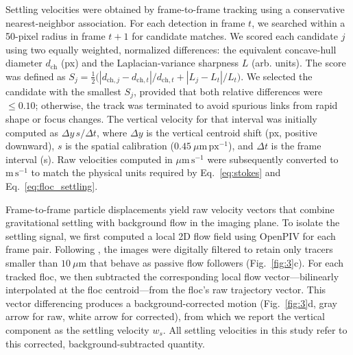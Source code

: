 \documentclass{agujournal2019}
\providecommand{\DIFadd}[1]{{\protect\color{blue} #1}} %
\providecommand{\DIFdel}[1]{{\protect\color{red}\sout{#1}}} %
\providecommand{\DIFaddbegin}{\protect\color{blue}} %
\providecommand{\DIFaddend}{\protect\color{black}} %
\providecommand{\DIFdelbegin}{\protect\color{red}} %
\providecommand{\DIFdelend}{\protect\color{black}} %
\newcommand{\DIFscaledelfig}{0.5}
\newlength{\DIFdelgraphicswidth} %
\newlength{\DIFdelgraphicsheight} %
\newcommand{\DIFaddincludegraphics}[2][]{{\color{blue}\fbox{\DIFOincludegraphics[#1]{#2}}}} %
\newcommand{\DIFdelincludegraphics}[2][]{%
\sbox{\DIFdelgraphicsbox}{\DIFOincludegraphics[#1]{#2}}%
\settoboxwidth{\DIFdelgraphicswidth}{\DIFdelgraphicsbox} %
\settoboxtotalheight{\DIFdelgraphicsheight}{\DIFdelgraphicsbox} %
\scalebox{\DIFscaledelfig}{%
\parbox[b]{\DIFdelgraphicswidth}{\usebox{\DIFdelgraphicsbox}\\[-\baselineskip] \rule{\DIFdelgraphicswidth}{0em}}\llap{\resizebox{\DIFdelgraphicswidth}{\DIFdelgraphicsheight}{%
\setlength{\unitlength}{\DIFdelgraphicswidth}%
\begin{picture}(1,1)%
\thicklines\linethickness{2pt} %
{\color[rgb]{1,0,0}\put(0,0){\framebox(1,1){}}}%
{\color[rgb]{1,0,0}\put(0,0){\line( 1,1){1}}}%
{\color[rgb]{1,0,0}\put(0,1){\line(1,-1){1}}}%
\end{picture}%
}\hspace*{3pt}}} %
} %
\DeclareRobustCommand{\DIFaddbegin}{\DIFOaddbegin \let\includegraphics\DIFaddincludegraphics} %
\DeclareRobustCommand{\DIFaddend}{\DIFOaddend \let\includegraphics\DIFOincludegraphics} %
\DeclareRobustCommand{\DIFdelbegin}{\DIFOdelbegin \let\includegraphics\DIFdelincludegraphics} %
\DeclareRobustCommand{\DIFdelend}{\DIFOaddend \let\includegraphics\DIFOincludegraphics} %
\begin{document}
Settling velocities were obtained by frame-to-frame tracking using a conservative nearest-neighbor association. For each detection in frame \(t\), we searched within a 50-pixel radius in frame \(t{+}1\) for candidate matches. We scored each candidate \(j\) using two equally weighted, normalized differences: the equivalent concave-hull diameter \(d_{\mathrm{ch}}\) (px) and the Laplacian-variance sharpness \(L\) (arb. units). The score was defined as \(S_j=\tfrac{1}{2}\big(|d_{\mathrm{ch},j}-d_{\mathrm{ch},t}|/d_{\mathrm{ch},t}+|L_j-L_t|/L_t\big)\). We selected the candidate with the smallest \(S_j\), provided that both relative differences were \(\le 0.10\); otherwise, the track was terminated to avoid spurious links from rapid shape or focus changes. The vertical velocity for that interval was initially computed as \(\Delta y\,s/\Delta t\), where \(\Delta y\) is the vertical centroid shift (px, positive downward), \(s\) is the spatial calibration (\(0.45~\mu\mathrm{m\,px^{-1}}\)), and \(\Delta t\) is the frame interval (s). Raw velocities computed in \(\mu\mathrm{m\,s^{-1}}\) were subsequently converted to \(\mathrm{m\,s^{-1}}\) to match the physical units required by Eq.~\eqref{eq:stokes} and Eq.~\eqref{eq:floc_settling}.

Frame-to-frame particle displacements yield raw \DIFdelbegin \DIFdel{two-dimensional }\DIFdelend \DIFaddbegin \DIFadd{2D }\DIFaddend velocity vectors that combine gravitational settling with background flow in the imaging plane. To isolate the settling signal, we first computed a local 2D flow field using OpenPIV \cite{liberzon2021openpiv} for each frame pair. Following , the images were digitally filtered to retain only tracers smaller than $10~\mu\mathrm{m}$ that behave as passive flow followers (Fig.~\ref{fig:3}c). For each tracked floc, we then subtracted the corresponding local flow vector---bilinearly interpolated at the floc centroid---from the floc's raw trajectory vector. This vector differencing produces a background-corrected motion (Fig.~\ref{fig:3}d, gray arrow for raw, white arrow for corrected), from which we report the vertical component as the settling velocity \(w_s\). All settling velocities in this study refer to this corrected, background-subtracted quantity.
\end{document}
